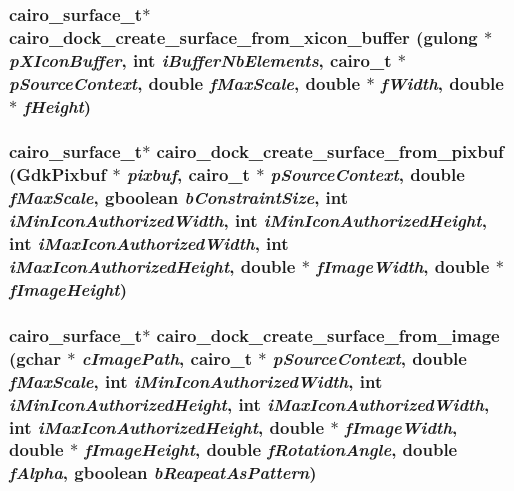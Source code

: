 \subsubsection{\setlength{\rightskip}{0pt plus 5cm}cairo\_\-surface\_\-t$\ast$ cairo\_\-dock\_\-create\_\-surface\_\-from\_\-xicon\_\-buffer (gulong $\ast$ {\em pXIconBuffer}, int {\em iBufferNbElements}, cairo\_\-t $\ast$ {\em pSourceContext}, double {\em fMaxScale}, double $\ast$ {\em fWidth}, double $\ast$ {\em fHeight})}\label{cairo-dock-surface-factory_8h_8b6a3e0b8a54450c1a667e558bfd7943}


\subsubsection{\setlength{\rightskip}{0pt plus 5cm}cairo\_\-surface\_\-t$\ast$ cairo\_\-dock\_\-create\_\-surface\_\-from\_\-pixbuf (GdkPixbuf $\ast$ {\em pixbuf}, cairo\_\-t $\ast$ {\em pSourceContext}, double {\em fMaxScale}, gboolean {\em bConstraintSize}, int {\em iMinIconAuthorizedWidth}, int {\em iMinIconAuthorizedHeight}, int {\em iMaxIconAuthorizedWidth}, int {\em iMaxIconAuthorizedHeight}, double $\ast$ {\em fImageWidth}, double $\ast$ {\em fImageHeight})}\label{cairo-dock-surface-factory_8h_407975a48fc32a8ce923f215083b16f7}


\subsubsection{\setlength{\rightskip}{0pt plus 5cm}cairo\_\-surface\_\-t$\ast$ cairo\_\-dock\_\-create\_\-surface\_\-from\_\-image (gchar $\ast$ {\em cImagePath}, cairo\_\-t $\ast$ {\em pSourceContext}, double {\em fMaxScale}, int {\em iMinIconAuthorizedWidth}, int {\em iMinIconAuthorizedHeight}, int {\em iMaxIconAuthorizedWidth}, int {\em iMaxIconAuthorizedHeight}, double $\ast$ {\em fImageWidth}, double $\ast$ {\em fImageHeight}, double {\em fRotationAngle}, double {\em fAlpha}, gboolean {\em bReapeatAsPattern})}\label{cairo-dock-surface-factory_8h_61e4d4ae332553013a6cd11f93540d90}


